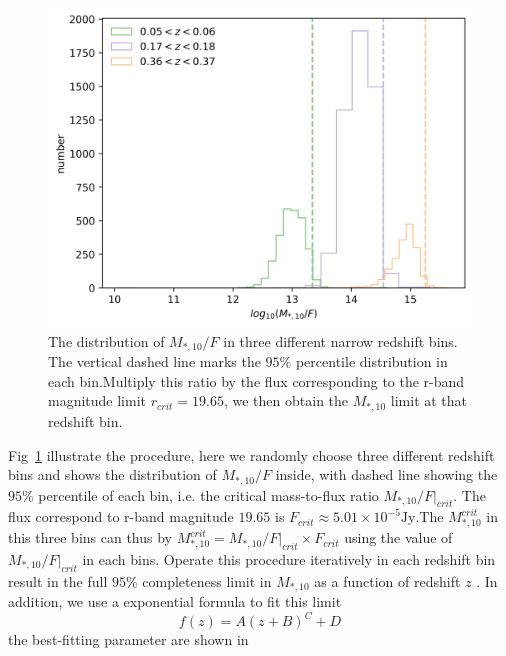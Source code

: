 \documentclass[fleqn,usenatbib]{mnras}
\begin{document}
\begin{figure}
    \centering
    \includegraphics[width=\linewidth]{figure/m2f_ratio.png}
    \caption{The distribution of $M_{*,10} / F$ in three different narrow redshift bins. The vertical dashed line marks the $95\%$ percentile distribution in each bin.Multiply this ratio by the flux corresponding to the r-band magnitude limit $r_{crit} = 19.65$, we then obtain the $M_{*,10}$ limit at that redshift bin.}
    \label{fig:m2f}
\end{figure}
\par Fig~\ref{fig:m2f} illustrate the procedure, here we randomly choose three different redshift bins and shows the distribution of $M_{*,10} / F$ inside, with dashed line showing the $95\%$ percentile of each bin, i.e. the critical mass-to-flux ratio $M_{*,10}/F|_{crit}$. The flux correspond to r-band magnitude $19.65$ is $F_{crit} \approx  5.01 \times 10^{-5} \text{Jy} $.The $M^{crit}_{*,10} $ in this three bins can thus by $M^{crit}_{*,10} = M_{*,10}/F|_{crit} \times F_{crit} $ using the value of $M_{*,10}/F|_{crit}$ in each bins.  Operate this procedure iteratively in each redshift bin result in the full $95\%$ completeness limit in $M_{*,10}$ as a function of redshift $z$ . In addition, we use a exponential formula to fit this limit
\begin{equation}
    f(z) = A(z+B)^C + D
\end{equation}
the best-fitting parameter are shown in 
\begin{table}
    \centering
    \caption{The best-fitting parameter of the exponential function that describe the $95\%$ completeness limit in $M_{*,10}$ as a function of redshift.}
    \label{tab:completeness}
\end{table}
\end{document}
